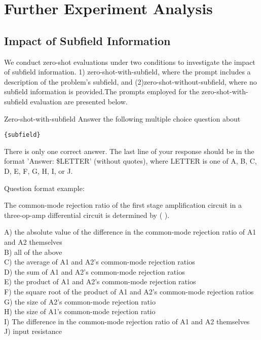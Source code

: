 \section{Further Experiment Analysis}

\subsection{Impact of Subfield Information}
\label{appendix:Impact of Subfield Information}

We conduct zero-shot evaluations under two conditions to investigate the impact of subfield information. 
1) zero-shot-with-subfield, where the prompt includes a description of the problem’s subfield, and (2)zero-shot-without-subfield, where no subfield information is provided.The prompts employed for the zero-shot-with-subfield evaluation are presented below.


\begin{promptbox}{Zero-shot-with-subfield}
Answer the following multiple choice question about 
\begin{verbatim}
{subfield}
\end{verbatim}
There is only one correct answer. The last line of your response should be in the format 'Answer: \$LETTER' (without quotes), where LETTER is one of A, B, C, D, E, F, G, H, I, or J.
\end{promptbox}
\vspace{0.5em}  
\begin{promptbox}{Question format example:}

The common-mode rejection ratio of the first stage amplification circuit in a three-op-amp differential circuit is determined by ( ).  

A) the absolute value of the difference in the common-mode rejection ratio of A1 and A2 themselves  
\\
B) all of the above  
\\
C) the average of A1 and A2's common-mode rejection ratios  
\\
D) the sum of A1 and A2's common-mode rejection ratios  
\\
E) the product of A1 and A2's common-mode rejection ratios  
\\
F) the square root of the product of A1 and A2's common-mode rejection ratios  
\\
G) the size of A2's common-mode rejection ratio  
\\
H) the size of A1's common-mode rejection ratio  
\\
I) The difference in the common-mode rejection ratio of A1 and A2 themselves  
\\
J) input resistance  
\end{promptbox}





